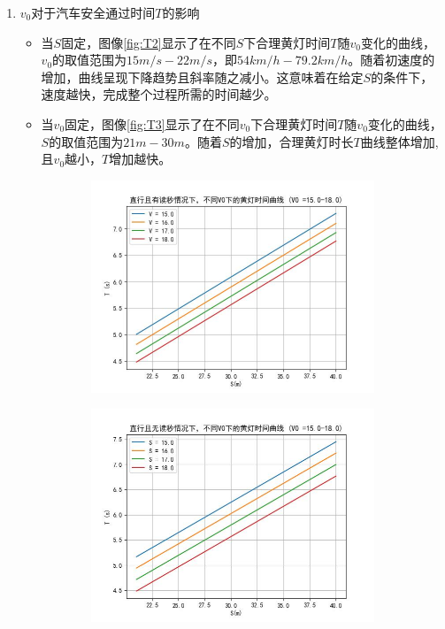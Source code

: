\documentclass[withoutpreface,bwprint]{cumcmthesis}
\begin{document}
\begin{enumerate}
	\item $v_0$对于汽车安全通过时间$T$的影响
	\begin{itemize}
		\item 当$S$固定，图像\ref{fig:T2}显示了在不同$S$下合理黄灯时间$T$随$v_0$变化的曲线，$v_0$的取值范围为$15m/s-22m/s$，即$54 km/h-79.2km/h$。随着初速度的增加，曲线呈现下降趋势且斜率随之减小。这意味着在给定$S$的条件下，速度越快，完成整个过程所需的时间越少。
		\item 	当$v_0$固定，图像\ref{fig:T3}显示了在不同$v_0$下合理黄灯时间$T$随$v_0$变化的曲线，$S$的取值范围为$21m-30m$。随着$S$的增加，合理黄灯时长$T$曲线整体增加,且$v_0$越小，$T$增加越快。
	\end{itemize}
	\begin{figure}[htbp!]
		\centering
		\begin{subfigure}[t]{0.45\textwidth}
			\centering
			\includegraphics[width=\textwidth]{pics/Time_Curve_V0_WCT_STR18.0}
			\label{fig:v01}
		\end{subfigure}
		\hfill
		\begin{subfigure}[t]{0.45\textwidth}
			\centering
			\includegraphics[width=\textwidth]{pics/Time_Curve_V0_WOCT_STR18.0}

\end{subfigure}
\end{figure}
\end{enumerate}
\end{document}
